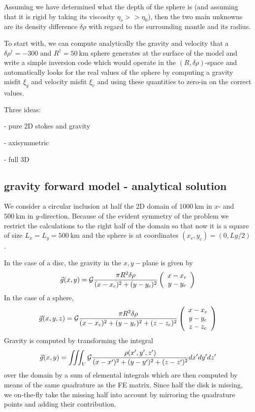 Assuming we have determined what the depth of the sphere is (and assuming that 
it is rigid by taking its viscosity $\eta_s >> \eta_0$), then the two main 
unknowns are its density difference $\delta \rho$ with regard to the surrounding mantle
and its radius. 

To start with, we can compute analytically the gravity and velocity that a 
$\delta\rho^\dag=-300$ and $R^\dag=50~\si{\km}$ sphere generates at the surface of the model
and write a simple inversion code which would operate in the $(R,\delta\rho)$-space 
and automatically looks for the real values of the sphere by computing a gravity misfit $\xi_g$ 
and velocity misfit $\xi_v$ and using these quantities to zero-in on the correct values.


Three ideas:

- pure 2D stokes and gravity

- axisymmetric

- full 3D


\subsection*{gravity forward model - analytical solution}

We consider a circular inclusion at half the 2D domain of 
$1000~\si{\km}$ in $x$- and $500~\si{\km}$ in $y$-direction. 
Because of the evident symmetry of the problem we restrict the 
calculations to the right half of the domain so that now it 
is a square of size $L_x=L_y=500~\si{\km}$ and the sphere is 
at coordinates $(x_c,y_c)=(0,Ly/2)$.

In the case of a disc, the gravity in the $x,y-$plane is given by 
\[
\vec{g}(x,y) = {\cal G} \frac{\pi R^2 \delta\rho}{(x-x_c)^2+(y-y_c)^2} 
\left(
\begin{array}{c}
x-x_c \\
y-y_c
\end{array}
\right)
\]
In the case of a sphere, 
\[
\vec{g}(x,y,z) = {\cal G} \frac{\pi R^2 \delta\rho}{(x-x_c)^2+(y-y_c)^2+(z-z_c)^2} 
\left(
\begin{array}{c}
x-x_c \\
y-y_c \\
z-z_c 
\end{array}
\right)
\]
Gravity is computed by transforming the integral 
\[
\vec{g}(x,y) = \iiint_V {\cal G} \frac{\rho(x',y',z')}{ (x-x')^2+(y-y')^2+(z-z')^2    } dx'dy'dz'
\]
over the domain by a sum of elemental 
integrals which are then computed by means of the same quadrature as the FE matrix. 
Since half the disk is missing, we on-the-fly take the missing half into account by 
mirroring the quadrature points and adding their contribution. 

